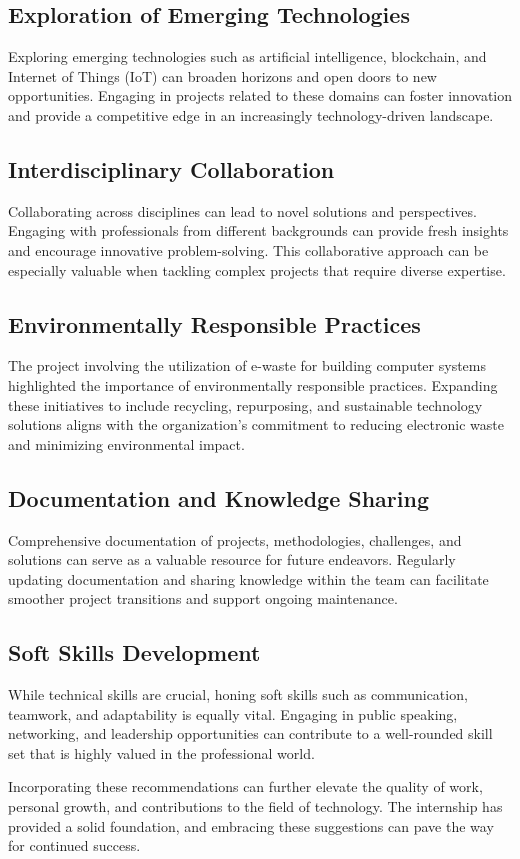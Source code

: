 \subsection{Exploration of Emerging Technologies}

Exploring emerging technologies such as artificial intelligence, blockchain, and Internet of Things (IoT) can broaden horizons and open doors to new opportunities. Engaging in projects related to these domains can foster innovation and provide a competitive edge in an increasingly technology-driven landscape.

\subsection{Interdisciplinary Collaboration}

Collaborating across disciplines can lead to novel solutions and perspectives. Engaging with professionals from different backgrounds can provide fresh insights and encourage innovative problem-solving. This collaborative approach can be especially valuable when tackling complex projects that require diverse expertise.

\subsection{Environmentally Responsible Practices}

The project involving the utilization of e-waste for building computer systems highlighted the importance of environmentally responsible practices. Expanding these initiatives to include recycling, repurposing, and sustainable technology solutions aligns with the organization's commitment to reducing electronic waste and minimizing environmental impact.

\subsection{Documentation and Knowledge Sharing}

Comprehensive documentation of projects, methodologies, challenges, and solutions can serve as a valuable resource for future endeavors. Regularly updating documentation and sharing knowledge within the team can facilitate smoother project transitions and support ongoing maintenance.

\subsection{Soft Skills Development}

While technical skills are crucial, honing soft skills such as communication, teamwork, and adaptability is equally vital. Engaging in public speaking, networking, and leadership opportunities can contribute to a well-rounded skill set that is highly valued in the professional world.

Incorporating these recommendations can further elevate the quality of work, personal growth, and contributions to the field of technology. The internship has provided a solid foundation, and embracing these suggestions can pave the way for continued success.
